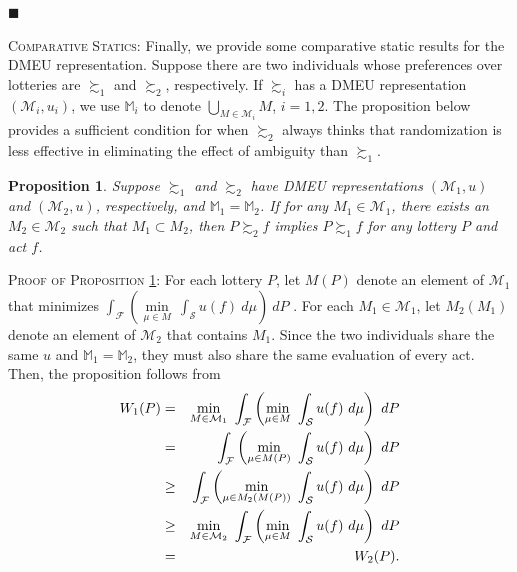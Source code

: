 \documentclass[12pt, notitlepage]{article}
\newtheorem{proposition}{Proposition}
\begin{document}
\begin{flushleft}
{$\blacksquare $\linebreak }
\end{flushleft}

{\textsc{Comparative Statics}}: Finally, we provide some comparative static
results for the DMEU representation. Suppose there are two individuals whose
preferences over lotteries are $\succsim _{1}$ and $\succsim _{2}$,
respectively. If $\succsim _{i}$ has a DMEU representation $(\mathcal{M}%
_{i},u_{i})$, we use $\mathbb{M}_{i}$ to denote $\bigcup_{M\in \mathcal{M}%
_{i}}M$, $i=1,2$. The proposition below provides a sufficient condition for
when $\succsim _{2}$ always thinks that randomization is less effective in
eliminating the effect of ambiguity than $\succsim _{1}$.

\begin{proposition}
\label{cs}Suppose $\succsim _{1}$ and $\succsim _{2}$ have DMEU
representations $(\mathcal{M}_{1},u)$ and $(\mathcal{M}_{2},u)$,
respectively, and $\mathbb{M}_{1}=\mathbb{M}_{2}$. If for any $M_{1}\in 
\mathcal{M}_{1}$, there exists an $M_{2}\in \mathcal{M}_{2}$ such that $%
M_{1}\subset M_{2}$, then $P\succsim _{2}f$ implies $P\succsim _{1}f$ for
any lottery $P$ and act $f$.
\end{proposition}

{\textsc{Proof of Proposition \ref{cs}}: For each lottery }$P$, let $M(P)$
denote an element of $\mathcal{M}_{1}$ that minimizes $\int_{\mathcal{F}%
}\left( \underset{\mu \in M}{\min }~\int_{\mathcal{S}}u(f)~d\mu \right) ~dP$%
. For each $M_{1}\in \mathcal{M}_{1}$, let $M_{2}(M_{1})$ denote an element
of $\mathcal{M}_{2}$ that contains $M_{1}$. {Since the two individuals share
the same }$u$ and $\mathbb{M}_{1}=\mathbb{M}_{2}$, they must also share the
same evaluation of every act. Then, t{he proposition follows from}%
\begin{eqnarray*}
W_{1}(P) &=&\min_{M\in \mathcal{M}_{1}}~\int_{\mathcal{F}}\left( \underset{%
\mu \in M}{\min }~\int_{\mathcal{S}}u(f)~d\mu \right) ~dP \\
&=&\int_{\mathcal{F}}\left( \underset{\mu \in M(P)}{\min }~\int_{\mathcal{S}%
}u(f)~d\mu \right) ~dP \\
&\geq &\int_{\mathcal{F}}\left( \underset{\mu \in M_{2}(M(P))}{\min }~\int_{%
\mathcal{S}}u(f)~d\mu \right) ~dP \\
&\geq &\min_{M\in \mathcal{M}_{2}}~\int_{\mathcal{F}}\left( \underset{\mu
\in M}{\min }~\int_{\mathcal{S}}u(f)~d\mu \right) ~dP \\
&=&W_{2}(P).
\end{eqnarray*}
\end{document}
